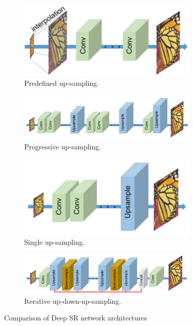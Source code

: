 \begin{figure}
    \centering
    \begin{subfigure}[b]{0.33\textwidth}
        \centering
        \includegraphics[width=0.95\textwidth]{figures/neural_networks/predefined_upsample.png}
        \caption{Predefined up-sampling.}\label{fig:predefups}
    \end{subfigure}
    \begin{subfigure}[b]{0.66\textwidth}
        \centering
        \includegraphics[width=0.95\textwidth]{figures/neural_networks/progressive_upsample.png}
        \caption{Progressive up-sampling.}\label{fig:profups}
    \end{subfigure}

    \begin{subfigure}[b]{0.33\textwidth}
        \centering
        \includegraphics[width=0.95\textwidth]{figures/neural_networks/single_upsample.png}
        \caption{Single up-sampling.}\label{fig:singups}
    \end{subfigure}
    \begin{subfigure}[b]{0.66\textwidth}
        \centering
        \includegraphics[width=0.95\textwidth]{figures/neural_networks/iterative_upsample.png}
        \caption{Iterative up-down-up-sampling.}\label{fig:iterups}
    \end{subfigure}
    \caption{Comparison of Deep SR network architectures \cite{haris2018deep}}\label{fig:comparedeepsr}
\end{figure}